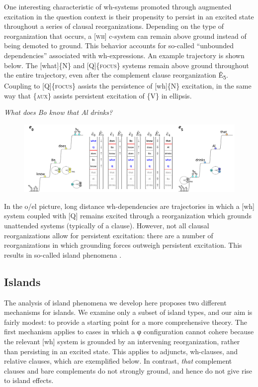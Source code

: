   One interesting characteristic of wh-systems promoted through augmented excitation in the question context is their propensity to persist in an excited state throughout a series of clausal reorganizations. Depending on the type of reorganization that occurs, a [\textsc{wh}] c-system can remain above ground instead of being demoted to ground. This behavior accounts for so-called “unbounded dependencies” associated with wh-expressions. An example trajectory is shown below. The [what]\{N\} and [Q]\{\textsc{focus}\} systems remain above ground throughout the entire trajectory, even after the complement clause reorganization Ê\textsubscript{5}. Coupling to  [Q]\{\textsc{focus}\} assists the persistence of [wh]\{N\} excitation, in the same way that \{\textsc{aux}\} assists persistent excitation of \{V\} in ellipsis. 

    \textit{What does Bo know that Al drinks?}

  
\begin{figure}
\includegraphics[width=\textwidth]{figures/Tilsen-img162.png}
\caption{\missingcaption}
\label{fig:}
\end{figure}
 

  In the o/el picture, long distance wh-dependencies are trajectories in which a [wh] system coupled with [Q] remains excited through a reorganization which grounds unattended systems (typically of a clause). However, not all clausal reorganizations allow for persistent excitation: there are a number of reorganizations in which grounding forces outweigh persistent excitation. This results in so-called island phenomena \citep{Ross1967}.

\subsection{Islands}

The analysis of island phenomena we develop here proposes two different mechanisms for islands. We examine only a subset of island types, and our aim is fairly modest: to provide a starting point for a more comprehensive theory. The first mechanism applies to cases in which a φ configuration cannot cohere because the relevant [wh] system is grounded by an intervening reorganization, rather than persisting in an excited state. This applies to adjuncts, wh-clauses, and relative clauses, which are exemplified below. In contrast, \textit{that} complement clauses and bare complements do not strongly ground, and hence do not give rise to island effects.

